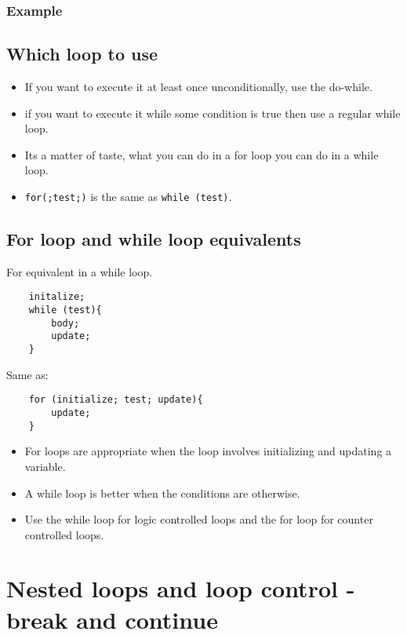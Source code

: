 \subsubsection{Example}

\subsection{Which loop to use}
\begin{itemize}
    \item If you want to execute it at least once unconditionally, use the do-while. 
    \item if you want to execute it while some condition is true then use a regular while loop. 
    \item Its a matter of taste, what you can do in a for loop you can do in a while loop. 
    \item \texttt{for(;test;)} is the same as \texttt{while (test)}.
\end{itemize}

\subsection{For loop and while loop equivalents}
For equivalent in a while loop. 
\begin{verbatim}
    initalize; 
    while (test){
        body; 
        update;
    }
\end{verbatim}
Same as: 
\begin{verbatim}
    for (initialize; test; update){ 
        update;
    }
\end{verbatim}

\begin{itemize}
    \item For loops are appropriate when the loop involves initializing and updating a variable. 
    \item A while loop is better when the conditions are otherwise. 
    \item Use the while loop for logic controlled loops and the for loop for counter controlled loops. 
\end{itemize}
\section{Nested loops and loop control - break and continue}
